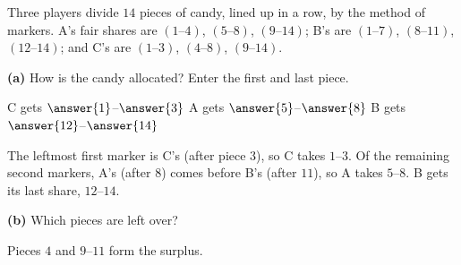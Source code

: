 \documentclass[12pt]{ximera}
\begin{document}
\begin{problem}
Three players divide $14$ pieces of candy, lined up in a row, by the method of markers.
A's fair shares are $(1\text{--}4)$, $(5\text{--}8)$, $(9\text{--}14)$; B's are
$(1\text{--}7)$, $(8\text{--}11)$, $(12\text{--}14)$; and C's are $(1\text{--}3)$,
$(4\text{--}8)$, $(9\text{--}14)$.

\begin{prompt}
\textbf{(a)} How is the candy allocated? Enter the first and last piece.

C gets $\answer{1}$--$\answer{3}$ \quad A gets $\answer{5}$--$\answer{8}$ \quad
B gets $\answer{12}$--$\answer{14}$
\begin{feedback}
The leftmost first marker is C's (after piece $3$), so C takes $1$--$3$. Of the
remaining second markers, A's (after $8$) comes before B's (after $11$), so A takes
$5$--$8$. B gets its last share, $12$--$14$.
\end{feedback}
\end{prompt}

\begin{prompt}
\textbf{(b)} Which pieces are left over?
\begin{selectAll}
\end{selectAll}
\begin{feedback}
Pieces $4$ and $9$--$11$ form the surplus.
\end{feedback}
\end{prompt}
\end{problem}
\end{document}
